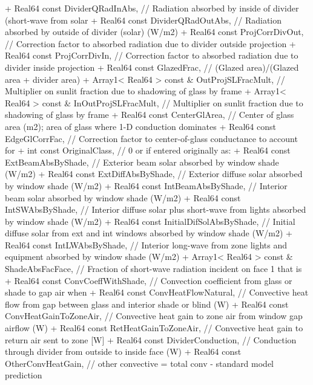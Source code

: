 \begin{DoxyCode}
+           Real64 const DividerQRadInAbs, // Radiation absorbed by inside of divider (short-wave from
       solar
+           Real64 const DividerQRadOutAbs, // Radiation absorbed by outside of divider (solar) (W/m2)
+           Real64 const ProjCorrDivOut, // Correction factor to absorbed radiation due to divider outside
       projection
+           Real64 const ProjCorrDivIn, // Correction factor to absorbed radiation due to divider inside
       projection
+           Real64 const GlazedFrac, // (Glazed area)/(Glazed area + divider area)
+           Array1< Real64 > const & OutProjSLFracMult, // Multiplier on sunlit fraction due to shadowing
       of glass by frame
+           Array1< Real64 > const & InOutProjSLFracMult, // Multiplier on sunlit fraction due to shadowing
       of glass by frame
+           Real64 const CenterGlArea, // Center of glass area (m2); area of glass where 1-D conduction
       dominates
+           Real64 const EdgeGlCorrFac, // Correction factor to center-of-glass conductance to account for
+           int const OriginalClass, // 0 or if entered originally as:
+           Real64 const ExtBeamAbsByShade, // Exterior beam solar absorbed by window shade (W/m2)
+           Real64 const ExtDiffAbsByShade, // Exterior diffuse solar absorbed by window shade (W/m2)
+           Real64 const IntBeamAbsByShade, // Interior beam solar absorbed by window shade (W/m2)
+           Real64 const IntSWAbsByShade, // Interior diffuse solar plus short-wave from lights absorbed by
       window shade (W/m2)
+           Real64 const InitialDifSolAbsByShade, // Initial diffuse solar from ext and int windows
       absorbed by window shade (W/m2)
+           Real64 const IntLWAbsByShade, // Interior long-wave from zone lights and equipment absorbed by
       window shade (W/m2)
+           Array1< Real64 > const & ShadeAbsFacFace, // Fraction of short-wave radiation incident on face
       1 that is
+           Real64 const ConvCoeffWithShade, // Convection coefficient from glass or shade to gap air when
+           Real64 const ConvHeatFlowNatural, // Convective heat flow from gap between glass and interior
       shade or blind (W)
+           Real64 const ConvHeatGainToZoneAir, // Convective heat gain to zone air from window gap airflow
       (W)
+           Real64 const RetHeatGainToZoneAir, // Convective heat gain to return air sent to zone [W]
+           Real64 const DividerConduction, // Conduction through divider from outside to inside face (W)
+           Real64 const OtherConvHeatGain, // other convective = total conv - standard model prediction

\end{DoxyCode}
